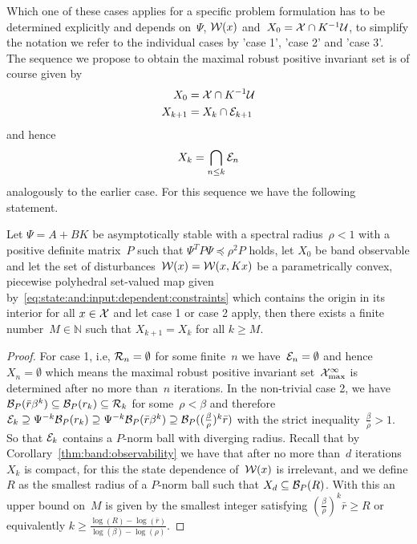 %
Which one of these cases applies for a specific problem formulation has to be determined explicitly and depends on~$\Psi$, $\mathcal W(x)$ and~$X_0=\mathcal X\cap K^{-1}\mathcal U$, to simplify the notation we refer to the individual cases by 'case 1', 'case 2' and 'case 3'.
%
\\[1em]
%
\noindent\mysplit The sequence we propose to obtain the maximal robust positive invariant set is of course given by
%
\begin{equation}\begin{aligned}
	X_0 &= \mathcal X\cap K^{-1}\mathcal U\\
	X_{k+1} &= X_k\cap \mathcal E_{k+1}
\end{aligned}\end{equation}
%
and hence 
%
\[
	X_k  = \bigcap_{n\leq k}\mathcal E_n
\]
%
analogously to the earlier case.
%
For this sequence we have the following statement.
%
\begin{thm}\label{thm:finite:determinatbility:MRPI:state:dependent}
Let $\Psi = A+BK$ be asymptotically stable with a spectral radius~$\rho<1$ with a positive definite matrix~$P$ such that $\Psi^T P \Psi \preceq \rho^2 P$ holds, let $X_0$ be band observable and let the set of disturbances~$\mathcal W(x) = \mathcal W(x,Kx)$ be a parametrically convex, piecewise polyhedral set-valued map given by~\eqref{eq:state:and:input:dependent:constraints} which contains the origin in its interior for all $x\in\mathcal X$ and let case 1 or case 2 apply, then there exists a finite number~$M\in\mathbb N$ such that $X_{k+1}=X_k$ for all $k\geq M$.
\end{thm}
%
\begin{proof}
%
For case 1, i.e, $\mathcal R_n=\emptyset$ for some finite~$n$ we have~$\mathcal E_n=\emptyset$ and hence~$X_n=\emptyset$ which means the maximal robust positive invariant set~$\mathcal X_{\max}^\infty$ is determined after no more than~$n$ iterations.
%
%
In the non-trivial case 2, we have~$\mathcal B_P(\bar r\beta^k)\subseteq\mathcal B_P(r_k)\subseteq \mathcal R_k$ for some~$\rho<\beta$ and therefore~$\mathcal E_k\supseteq\Psi^{-k}\mathcal B_P(r_k)\supseteq\Psi^{-k}\mathcal B_P(\bar r\beta^k)\supseteq\mathcal B_P((\frac{\beta}{\rho})^k\bar r)$ with the strict inequality~$\frac{\beta}{\rho}>1$.
%
So that $\mathcal E_k$ contains a $P$-norm ball with diverging radius.
%
Recall that by Corollary~\ref{thm:band:observability} we have that after no more than~$d$ iterations $X_k$ is compact, for this the state dependence of~$\mathcal W(x)$ is irrelevant, and we define $R$ as the smallest radius of a $P$-norm ball such that $X_d\subseteq\mathcal B_P(R)$.
%
With this an upper bound on~$M$ is given by the smallest integer satisfying $(\frac{\beta}{\rho})^k\bar r\geq R$ or equivalently $k\geq\frac{\log(R)-\log(\bar r)}{\log(\beta)-\log(\rho)}$.
\end{proof}%
